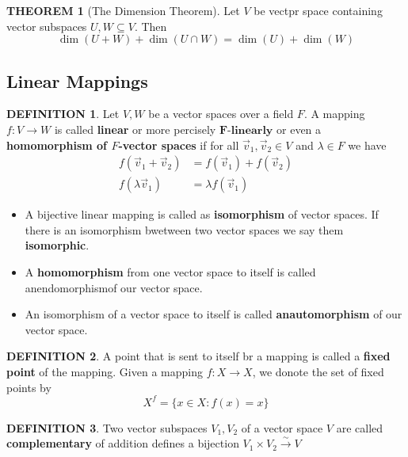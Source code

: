\documentclass[10pt]{article}
\theoremstyle{definition}
\newtheorem{definition}{DEFINITION}[subsection]
\newtheorem{theorem}{THEOREM}[subsection]
\begin{document}
\begin{theorem}[The Dimension Theorem]
    Let $V$ be vectpr space containing vector subspaces $U,W \subseteq V$. Then
    $$\dim(U + W) + \dim(U\cap W) = \dim(U) + \dim(W)$$
\end{theorem}

\subsection{Linear Mappings}
\begin{definition}
    Let $V,W$ be a vector spaces over a field $F$. A mapping $f: V \rightarrow W$ is called \textbf{linear} or more percisely $\mathbf{F}\textbf{-linearly}$ or even a \textbf{homomorphism of $F$-vector spaces} if for all $\overrightarrow{v}_1, \overrightarrow{v}_2 \in V$ and $\lambda \in F$ we have \[\begin{split}
        f(\overrightarrow{v}_1 + \overrightarrow{v}_2) &= f(\overrightarrow{v}_1) + f(\overrightarrow{v}_2)\\
        f(\lambda\overrightarrow{v}_1) &= \lambda f(\overrightarrow{v}_1) 
    \end{split}\]
\end{definition}

\begin{itemize}
    \item A bijective linear mapping is called as \textbf{isomorphism} of vector spaces. If there is an isomorphism bwetween two vector spaces we say them \textbf{isomorphic}.
    \item A \textbf{homomorphism} from one vector space to itself is called anendomorphismof our vector space.
    \item An isomorphism of a vector space to itself is called \textbf{anautomorphism} of our vector space.
\end{itemize}

\begin{definition}
    A point that is sent to itself br a mapping is called a \textbf{fixed point} of the mapping.
    Given a mapping $f: X \rightarrow X$, we donote the set of fixed points by $$X^f = \{x \in X: f(x) = x\}$$
\end{definition}

\begin{definition}
    Two vector subspaces $V_1,V_2$ of a vector space $V$ are called \textbf{complementary} of addition defines a bijection $V_1 \times V_2 {\stackrel{\sim}{\rightarrow}} V$
\end{definition}
\end{document}
